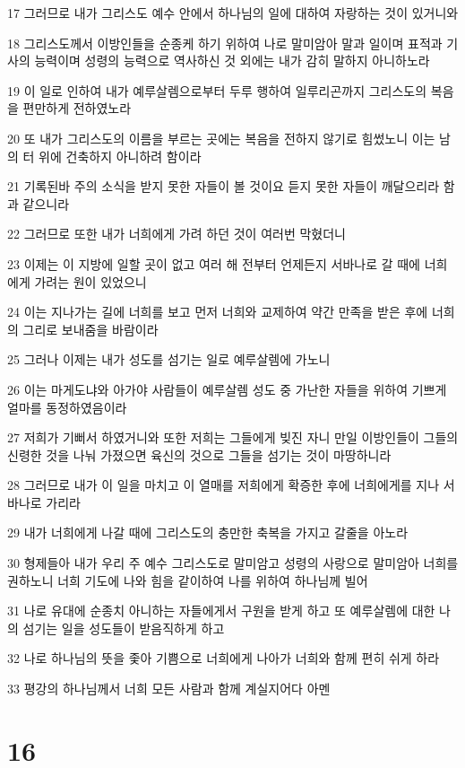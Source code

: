 \par 17 그러므로 내가 그리스도 예수 안에서 하나님의 일에 대하여 자랑하는 것이 있거니와
\par 18 그리스도께서 이방인들을 순종케 하기 위하여 나로 말미암아 말과 일이며 표적과 기사의 능력이며 성령의 능력으로 역사하신 것 외에는 내가 감히 말하지 아니하노라
\par 19 이 일로 인하여 내가 예루살렘으로부터 두루 행하여 일루리곤까지 그리스도의 복음을 편만하게 전하였노라
\par 20 또 내가 그리스도의 이름을 부르는 곳에는 복음을 전하지 않기로 힘썼노니 이는 남의 터 위에 건축하지 아니하려 함이라
\par 21 기록된바 주의 소식을 받지 못한 자들이 볼 것이요 듣지 못한 자들이 깨달으리라 함과 같으니라
\par 22 그러므로 또한 내가 너희에게 가려 하던 것이 여러번 막혔더니
\par 23 이제는 이 지방에 일할 곳이 없고 여러 해 전부터 언제든지 서바나로 갈 때에 너희에게 가려는 원이 있었으니
\par 24 이는 지나가는 길에 너희를 보고 먼저 너희와 교제하여 약간 만족을 받은 후에 너희의 그리로 보내줌을 바람이라
\par 25 그러나 이제는 내가 성도를 섬기는 일로 예루살렘에 가노니
\par 26 이는 마게도냐와 아가야 사람들이 예루살렘 성도 중 가난한 자들을 위하여 기쁘게 얼마를 동정하였음이라
\par 27 저희가 기뻐서 하였거니와 또한 저희는 그들에게 빚진 자니 만일 이방인들이 그들의 신령한 것을 나눠 가졌으면 육신의 것으로 그들을 섬기는 것이 마땅하니라
\par 28 그러므로 내가 이 일을 마치고 이 열매를 저희에게 확증한 후에 너희에게를 지나 서바나로 가리라
\par 29 내가 너희에게 나갈 때에 그리스도의 충만한 축복을 가지고 갈줄을 아노라
\par 30 형제들아 내가 우리 주 예수 그리스도로 말미암고 성령의 사랑으로 말미암아 너희를 권하노니 너희 기도에 나와 힘을 같이하여 나를 위하여 하나님께 빌어
\par 31 나로 유대에 순종치 아니하는 자들에게서 구원을 받게 하고 또 예루살렘에 대한 나의 섬기는 일을 성도들이 받음직하게 하고
\par 32 나로 하나님의 뜻을 좇아 기쁨으로 너희에게 나아가 너희와 함께 편히 쉬게 하라
\par 33 평강의 하나님께서 너희 모든 사람과 함께 계실지어다 아멘

\chapter{16}

